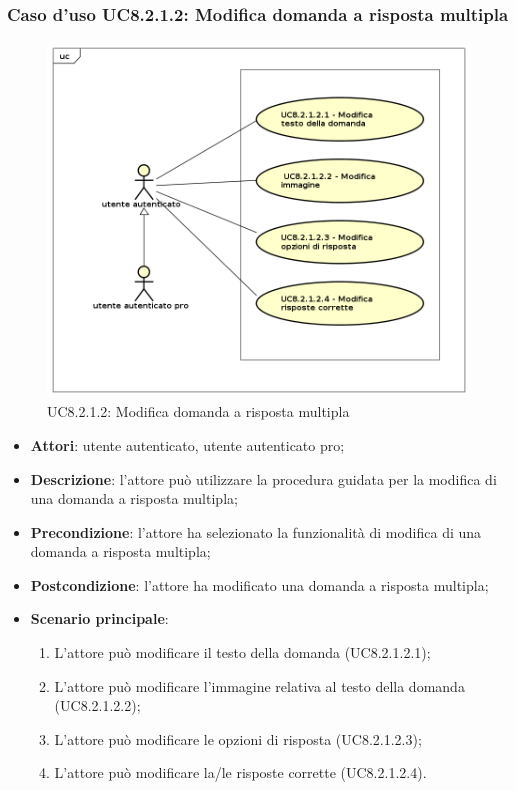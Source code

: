 \subsubsection{Caso d'uso UC8.2.1.2: Modifica domanda a risposta multipla}
	\label{UC8.2.1.2}
	\begin{figure}[h]
		\centering
			\includegraphics[scale=0.45,keepaspectratio]{UML/UC8_2_1_2.png}
		\caption{UC8.2.1.2: Modifica domanda a risposta multipla}
	\end{figure}
	\FloatBarrier
	\begin{itemize}
		\item
			\textbf{Attori}: utente autenticato, utente autenticato pro;
		\item		
			\textbf{Descrizione}: l'attore può utilizzare la procedura guidata per la modifica di una domanda a risposta multipla;
		\item
			\textbf{Precondizione}: l'attore ha selezionato la funzionalità di modifica di una domanda a risposta multipla; 
		\item
			\textbf{Postcondizione}: l'attore ha modificato una domanda a risposta multipla;
		\item
			\textbf{Scenario principale}:
	       		\begin{enumerate}
	       			\item
	       			L'attore può modificare il testo della domanda (UC8.2.1.2.1);
	       			\item
	       			L'attore può modificare l'immagine relativa al testo della domanda (UC8.2.1.2.2);
	       			\item
	       			L'attore può modificare le opzioni di risposta (UC8.2.1.2.3);
					\item
					L'attore può modificare la/le risposte corrette (UC8.2.1.2.4).
	 			\end{enumerate}
	\end{itemize}

